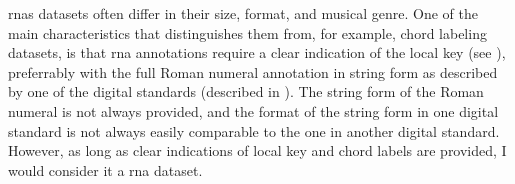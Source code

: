 
\glspl{rna} datasets often  differ in their size, format,
and musical genre. One of the main characteristics that
distinguishes them from, for example, chord labeling
datasets, is that \gls{rna} annotations require a clear
indication of the local key (see ),
preferrably with the full Roman numeral annotation in string
form as described by one of the digital standards (described
in ). The string form of the
Roman numeral is not always provided, and the format of the
string form in one digital standard is not always easily
comparable to the one in another digital standard. However,
as long as clear indications of local key and chord labels
are provided, I would consider it a \gls{rna} dataset.